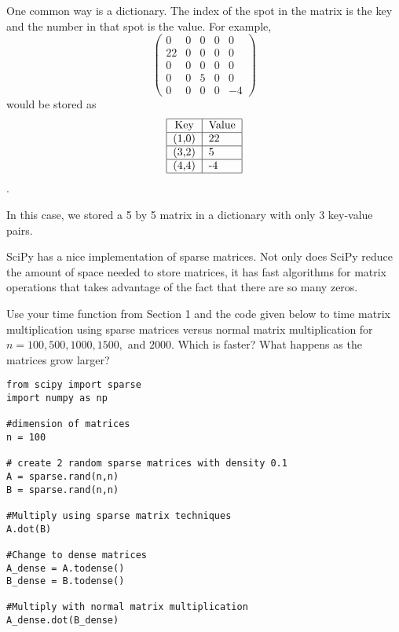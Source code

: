 One common way is a dictionary.
The index of the spot in the matrix is the key and the number in that spot is the value.
For example,
\[
\begin{pmatrix}
0 & 0 & 0 & 0 & 0 \\
22 & 0 & 0 & 0 & 0 \\
0 & 0 & 0 & 0 & 0 \\
0 & 0 & 5 & 0 & 0 \\
0 & 0 & 0 & 0 & -4
\end{pmatrix}
\]
would be stored as
\[
\begin{tabular}{|c|l|}
\hline
Key & Value \\
\hline
(1,0) & 22 \\
\hline
(3,2) & 5 \\
\hline
(4,4) & -4 \\
\hline
\end{tabular}
\].

In this case, we stored a 5 by 5 matrix in a dictionary with only 3 key-value pairs.

SciPy has a nice implementation of sparse matrices.
Not only does SciPy reduce the amount of space needed to store matrices, it has fast algorithms for matrix operations that takes advantage of the fact that there are so many zeros.

\begin{problem}
Use your time function from Section 1 and the code given below to time matrix multiplication using sparse matrices versus normal matrix multiplication for $ n = 100, 500, 1000, 1500,$ and $2000$. Which is faster? What happens as the matrices grow larger?
\begin{lstlisting}
from scipy import sparse
import numpy as np

#dimension of matrices
n = 100

# create 2 random sparse matrices with density 0.1
A = sparse.rand(n,n)
B = sparse.rand(n,n)

#Multiply using sparse matrix techniques
A.dot(B)

#Change to dense matrices
A_dense = A.todense()
B_dense = B.todense()

#Multiply with normal matrix multiplication
A_dense.dot(B_dense)

 \end{lstlisting}
 \label{prob:Sparse}
 \end{problem}

